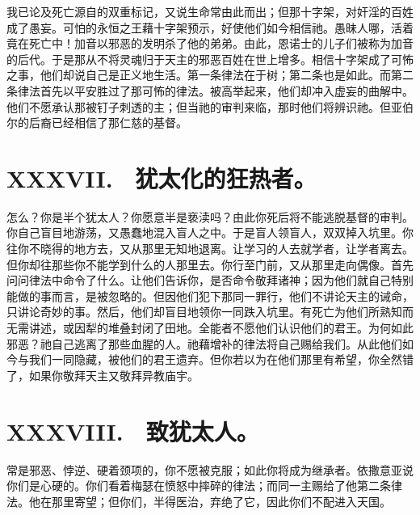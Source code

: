 我已论及死亡源自的双重标记，又说生命常由此而出；但那十字架，对奸淫的百姓成了愚妄。可怕的永恒之王藉十字架预示，好使他们如今相信祂。愚昧人哪，活着竟在死亡中！加音以邪恶的发明杀了他的弟弟。由此，恩诺士的儿子们被称为加音的后代。于是那从不将灵魂归于天主的邪恶百姓在世上增多。相信十字架成了可怖之事，他们却说自己是正义地生活。第一条律法在于树；第二条也是如此。而第二条律法首先以平安胜过了那可怖的律法。被高举起来，他们却冲入虚妄的曲解中。他们不愿承认那被钉子刺透的主；但当祂的审判来临，那时他们将辨识祂。但亚伯尔的后裔已经相信了那仁慈的基督。\par


\section{XXXVII.　犹太化的狂热者。}

怎么？你是半个犹太人？你愿意半是亵渎吗？由此你死后将不能逃脱基督的审判。你自己盲目地游荡，又愚蠢地混入盲人之中。于是盲人领盲人，双双掉入坑里。你往你不晓得的地方去，又从那里无知地退离。让学习的人去就学者，让学者离去。但你却往那些你不能学到什么的人那里去。你行至门前，又从那里走向偶像。首先问问律法中命令了什么。让他们告诉你，是否命令敬拜诸神；因为他们就自己特别能做的事而言，是被忽略的。但因他们犯下那同一罪行，他们不讲论天主的诫命，只讲论奇妙的事。然后，他们却盲目地领你一同跌入坑里。有死亡为他们所熟知而无需讲述，或因犁的堆叠封闭了田地。全能者不愿他们认识他们的君王。为何如此邪恶？祂自己逃离了那些血腥的人。祂藉增补的律法将自己赐给我们。从此他们如今与我们一同隐藏，被他们的君王遗弃。但你若以为在他们那里有希望，你全然错了，如果你敬拜天主又敬拜异教庙宇。\par


\section{XXXVIII.　致犹太人。}

常是邪恶、悖逆、硬着颈项的，你不愿被克服；如此你将成为继承者。依撒意亚说你们是心硬的。你们看着梅瑟在愤怒中摔碎的律法；而同一主赐给了他第二条律法。他在那里寄望；但你们，半得医治，弃绝了它，因此你们不配进入天国。\par


